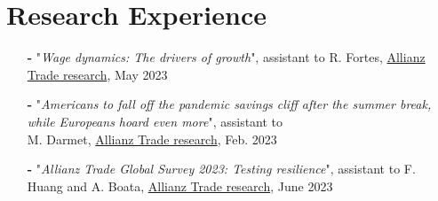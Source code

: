\documentclass[letterpaper,10pt]{article}
\begin{document}
\section{Research Experience}
\begin{itemize}
    \item[\textbf{-}] \small{"\textit{Wage dynamics: The drivers of growth}", assistant to R. Fortes, \textcolor{blue(pigment)}{\href{https://www.allianz.com/content/dam/onemarketing/azcom/Allianz_com/economic-research/publications/specials/en/2023/may/2023-05-03-LaborMarkets.pdf}{Allianz Trade research}}, May 2023}
    \item[\textbf{-}] \small{"\textit{Americans to fall off the pandemic savings cliff after the summer break, while Europeans hoard even more}", assistant to \\M. Darmet, \textcolor{blue(pigment)}{\href{https://www.allianz-trade.com/content/dam/onemarketing/aztrade/allianz-trade_com/en_gl/erd/publications/pdf/2023_02_02_excess_savings.pdf}{Allianz Trade research}}, Feb. 2023}
    \item[\textbf{-}] \small{"\textit{Allianz Trade Global Survey 2023: Testing resilience}", assistant to F. Huang and A. Boata, \textcolor{blue(pigment)}{\href{https://www.allianz.com/content/dam/onemarketing/azcom/Allianz_com/economic-research/publications/specials/en/2023/june/2023_06_01_TRADE-SURVEY23_AZ.pdf}{Allianz Trade research}}, June 2023}
\end{itemize}
\end{document}

